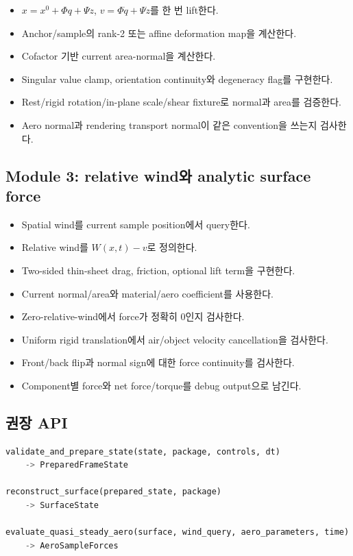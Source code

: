 \documentclass[10pt,a4paper]{article}
\newcommand{\todo}{\textcolor{TodoGray}{\(\square\)}}
\begin{document}
\begin{itemize}
  \item[\todo] \(x=x^0+\Phi q+\Psi z\), \(v=\Phi\dot q+\Psi\dot z\)를 한 번 lift한다.
  \item[\todo] Anchor/sample의 rank-2 또는 affine deformation map을 계산한다.
  \item[\todo] Cofactor 기반 current area-normal을 계산한다.
  \item[\todo] Singular value clamp, orientation continuity와 degeneracy flag를 구현한다.
  \item[\todo] Rest/rigid rotation/in-plane scale/shear fixture로 normal과 area를 검증한다.
  \item[\todo] Aero normal과 rendering transport normal이 같은 convention을 쓰는지 검사한다.
\end{itemize}

\subsection*{Module 3: relative wind와 analytic surface force}

\begin{itemize}
  \item[\todo] Spatial wind를 current sample position에서 query한다.
  \item[\todo] Relative wind를 \(W(x,t)-v\)로 정의한다.
  \item[\todo] Two-sided thin-sheet drag, friction, optional lift term을 구현한다.
  \item[\todo] Current normal/area와 material/aero coefficient를 사용한다.
  \item[\todo] Zero-relative-wind에서 force가 정확히 0인지 검사한다.
  \item[\todo] Uniform rigid translation에서 air/object velocity cancellation을 검사한다.
  \item[\todo] Front/back flip과 normal sign에 대한 force continuity를 검사한다.
  \item[\todo] Component별 force와 net force/torque를 debug output으로 남긴다.
\end{itemize}

\subsection*{권장 API}

\begin{lstlisting}[language=Python]
validate_and_prepare_state(state, package, controls, dt)
    -> PreparedFrameState

reconstruct_surface(prepared_state, package)
    -> SurfaceState

evaluate_quasi_steady_aero(surface, wind_query, aero_parameters, time)
    -> AeroSampleForces
\end{lstlisting}
\end{document}
